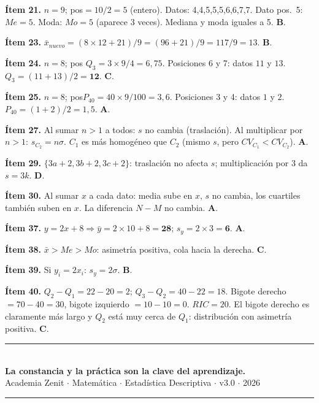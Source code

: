 \documentclass[11pt, letterpaper]{article}
\begin{document}
\textbf{Ítem 21.} $n=9$; pos$=10/2=5$ (entero). Datos: 4,4,5,5,5,6,6,7,7. Dato pos.\ 5: $Me=5$. Moda: $Mo=5$ (aparece 3 veces). Mediana y moda iguales a 5. \textbf{B}.

\textbf{Ítem 23.} $\bar{x}_{nuevo}=(8\times12+21)/9=(96+21)/9=117/9=13$. \textbf{B}.

\textbf{Ítem 24.} $n=8$; pos $Q_3=3\times9/4=6{,}75$. Posiciones 6 y 7: datos $11$ y $13$. $Q_3=(11+13)/2=\mathbf{12}$. \textbf{C}.

\textbf{Ítem 25.} $n=8$; pos$P_{40}=40\times9/100=3{,}6$. Posiciones 3 y 4: datos $1$ y $2$. $P_{40}=(1+2)/2=1{,}5$. \textbf{A}.

\textbf{Ítem 27.} Al sumar $n>1$ a todos: $s$ no cambia (traslación). Al multiplicar por $n>1$: $s_{C_2}=n\sigma$. $C_1$ es más homogéneo que $C_2$ (mismo $s$, pero $CV_{C_1}<CV_{C_2}$). \textbf{A}.

\textbf{Ítem 29.} $\{3a+2,3b+2,3c+2\}$: traslación no afecta $s$; multiplicación por 3 da $s=3k$. \textbf{D}.

\textbf{Ítem 30.} Al sumar $x$ a cada dato: media sube en $x$, $s$ no cambia, los cuartiles también suben en $x$. La diferencia $N-M$ no cambia. \textbf{A}.

\textbf{Ítem 37.} $y=2x+8 \Rightarrow \bar{y}=2\times10+8=\mathbf{28}$; $s_y=2\times3=\mathbf{6}$. \textbf{A}.

\textbf{Ítem 38.} $\bar{x}>Me>Mo$: asimetría positiva, cola hacia la derecha. \textbf{C}.

\textbf{Ítem 39.} Si $y_i=2x_i$: $s_y=2\sigma$. \textbf{B}.

\textbf{Ítem 40.} $Q_2-Q_1=22-20=2$; $Q_3-Q_2=40-22=18$. Bigote derecho $=70-40=30$, bigote izquierdo $=10-10=0$. $RIC=20$. El bigote derecho es claramente más largo y $Q_2$ está muy cerca de $Q_1$: distribución con asimetría positiva. \textbf{C}.

\vspace{8pt}
\begin{center}
  \rule{\linewidth}{1.5pt}\\[4pt]
  {\large\bfseries\color{zenitnavy} La constancia y la práctica son la clave del aprendizaje.}\\[2pt]
  {\color{zenitgold}\small Academia Zenit $\cdot$ Matemática $\cdot$ Estadística Descriptiva $\cdot$ v3.0 $\cdot$ 2026}\\[2pt]
  \rule{\linewidth}{1.5pt}
\end{center}
\end{document}
